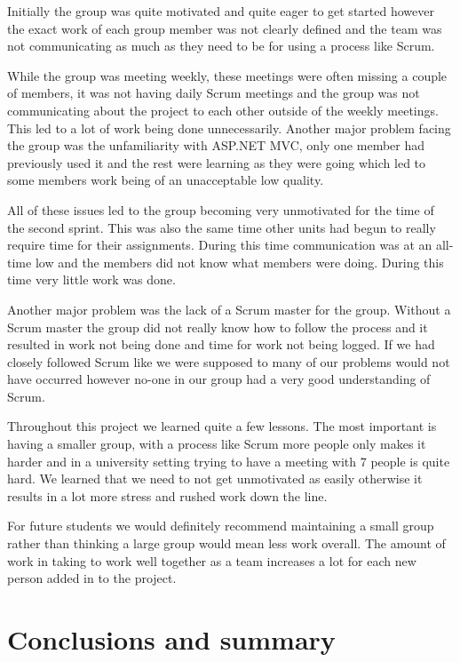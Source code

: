 \documentclass[a4paper,titlepage,12pt]{article}
\let\stdsection\section
\renewcommand\section{\newpage\stdsection}
\begin{document}
Initially the group was quite motivated and quite eager to get started however
the exact work of each group member was not clearly defined and the team was
not communicating as much as they need to be for using a process like Scrum.

While the group was meeting weekly, these meetings were often missing a couple
of members, it was not having daily Scrum meetings and the group was not
communicating about the project to each other outside of the weekly meetings.
This led to a lot of work being done unnecessarily. Another major problem
facing the group was the unfamiliarity with ASP.NET MVC, only one member had
previously used it and the rest were learning as they were going which led to
some members work being of an unacceptable low quality.

All of these issues led to the group becoming very unmotivated for the time of
the second sprint. This was also the same time other units had begun to really
require time for their assignments. During this time communication was at an
all-time low and the members did not know what members were doing. During this
time very little work was done.

Another major problem was the lack of a Scrum master for the group. Without a
Scrum master the group did not really know how to follow the process and it
resulted in work not being done and time for work not being logged. If we had
closely followed Scrum like we were supposed to many of our problems would not
have occurred however no-one in our group had a very good understanding of
Scrum.

Throughout this project we learned quite a few lessons. The most important is
having a smaller group, with a process like Scrum more people only makes it
harder and in a university setting trying to have a meeting with 7 people is
quite hard. We learned that we need to not get unmotivated as easily otherwise
it results in a lot more stress and rushed work down the line.

For future students we would definitely recommend maintaining a small group
rather than thinking a large group would mean less work overall. The amount of
work in taking to work well together as a team increases a lot for each new
person added in to the project.

\section{Conclusions and summary}
\end{document}
